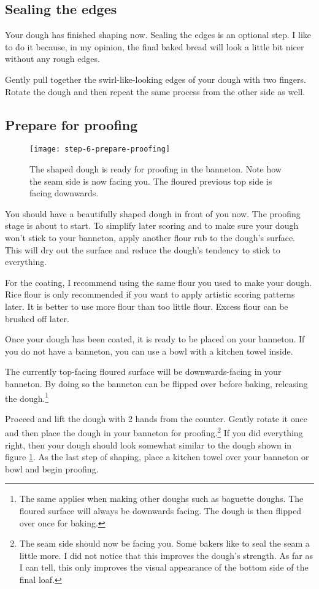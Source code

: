 \subsection[Sealing]{Sealing the edges}

Your dough has finished shaping now. Sealing the edges
is an optional step. I like to do it because, in my opinion,
the final baked bread will look a little bit nicer without
any rough edges.

Gently pull together the swirl-like-looking edges of your dough
with two fingers. Rotate the dough and then repeat the same process
from the other side as well.

\subsection[Proofing preparation]{Prepare for proofing}

\begin{figure}[htb!]
  \texttt{[image: step-6-prepare-proofing]}
  \caption{The shaped dough is ready for proofing in the banneton. Note how the seam side
  is now facing you. The floured previous top side is facing downwards.}
  \label{fig:shaping-prepare-proofing}
\end{figure}

You should have a beautifully shaped dough in front of you now.
The proofing stage is about to start. To simplify later
scoring and to make sure your dough won't stick to your banneton,
apply another flour rub to the dough's surface. This
will dry out the surface and reduce the dough's tendency
to stick to everything.

For the coating, I recommend using the same flour you used
to make your dough. Rice flour is only recommended if you
want to apply artistic scoring patterns later. It is better
to use more flour than too little flour. Excess flour can be
brushed off later.

Once your dough has been coated, it is ready to be placed on your banneton.
If you do not have a banneton, you can use a bowl
with a kitchen towel inside.

The currently top-facing floured surface will be downwards-facing in your banneton.
By doing so the banneton can be flipped
over before baking, releasing the dough.\footnote{The same
applies when making other doughs such as baguette doughs. The floured
surface will always be downwards facing. The dough is then flipped over
once for baking.}

Proceed and lift the dough with 2 hands from the counter.
Gently rotate it once and then place the dough in your
banneton for proofing.\footnote{The seam side should now be facing you.
Some bakers like to seal the seam a little more. I did
not notice that this improves the dough's strength. As far as I can
tell, this only improves the visual appearance of the bottom side
of the final loaf.} If you did everything right, then your
dough should look somewhat similar to the dough shown in figure \ref{fig:shaping-prepare-proofing}.
As the last step of shaping, place a kitchen towel over your banneton
or bowl and begin proofing.

